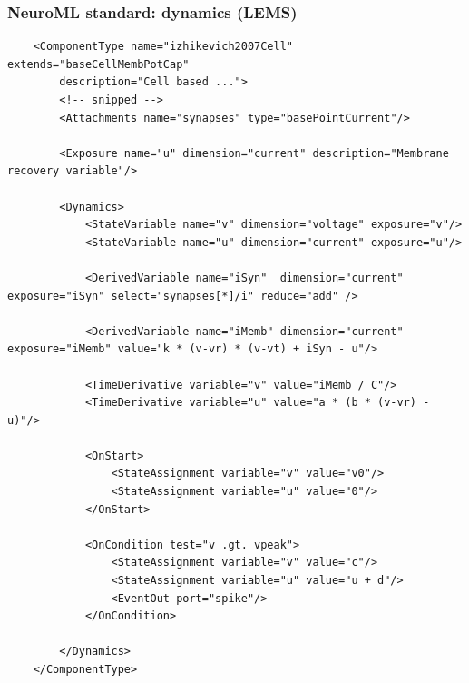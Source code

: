 \begin{frame}[fragile,c]
  \frametitle{NeuroML standard: dynamics (LEMS)}
  \begin{center}
    \begin{verbatim}
    <ComponentType name="izhikevich2007Cell" extends="baseCellMembPotCap"
        description="Cell based ...">
        <!-- snipped -->
        <Attachments name="synapses" type="basePointCurrent"/>

        <Exposure name="u" dimension="current" description="Membrane recovery variable"/>

        <Dynamics>
            <StateVariable name="v" dimension="voltage" exposure="v"/>
            <StateVariable name="u" dimension="current" exposure="u"/>

            <DerivedVariable name="iSyn"  dimension="current" exposure="iSyn" select="synapses[*]/i" reduce="add" />

            <DerivedVariable name="iMemb" dimension="current" exposure="iMemb" value="k * (v-vr) * (v-vt) + iSyn - u"/>

            <TimeDerivative variable="v" value="iMemb / C"/>
            <TimeDerivative variable="u" value="a * (b * (v-vr) - u)"/>

            <OnStart>
                <StateAssignment variable="v" value="v0"/>
                <StateAssignment variable="u" value="0"/>
            </OnStart>

            <OnCondition test="v .gt. vpeak">
                <StateAssignment variable="v" value="c"/>
                <StateAssignment variable="u" value="u + d"/>
                <EventOut port="spike"/>
            </OnCondition>

        </Dynamics>
    </ComponentType>
    \end{verbatim}
  \end{center}
\end{frame}
